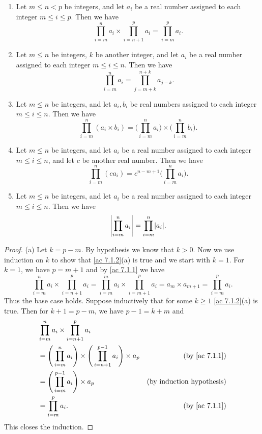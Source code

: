\begin{additional corollary}\label{ac 7.1.2}
\mbox{}
\begin{enumerate}
  \item Let \(m \leq n < p\) be integers, and let \(a_i\) be a real number assigned to each integer \(m \leq i \leq p\).
        Then we have
        \[
          \prod_{i = m}^n a_i \times \prod_{i = n + 1}^p a_i = \prod_{i = m}^p a_i.
        \]
  \item Let \(m \leq n\) be integers, \(k\) be another integer, and let \(a_i\) be a real number assigned to each integer \(m \leq i \leq n\).
        Then we have
        \[
          \prod_{i = m}^n a_i = \prod_{j = m + k}^{n + k} a_{j - k}.
        \]
  \item Let \(m \leq n\) be integers, and let \(a_i, b_i\) be real numbers assigned to each integer \(m \leq i \leq n\).
        Then we have
        \[
          \prod_{i = m}^n (a_i \times b_i) = \Bigg(\prod_{i = m}^n a_i\Bigg) \times \Bigg(\prod_{i = m}^n b_i\Bigg).
        \]
  \item Let \(m \leq n\) be integers, and let \(a_i\) be a real number assigned to each integer \(m \leq i \leq n\), and let \(c\) be another real number.
        Then we have
        \[
          \prod_{i = m}^n (ca_i) = c^{n - m + 1} \Bigg(\prod_{i = m}^n a_i\Bigg).
        \]
  \item Let \(m \leq n\) be integers, and let \(a_i\) be a real number assigned to each integer \(m \leq i \leq n\).
        Then we have
        \[
          \abs{\prod_{i = m}^n a_i} = \prod_{i = m}^n \abs{a_i}.
        \]
\end{enumerate}
\end{additional corollary}

\begin{proof}{(a)}
  Let \(k = p - m\).
  By hypothesis we know that \(k > 0\).
  Now we use induction on \(k\) to show that \cref{ac 7.1.2}(a) is true and we start with \(k = 1\).
  For \(k = 1\), we have \(p = m + 1\) and by \cref{ac 7.1.1} we have
  \[
    \prod_{i = m}^n a_i \times \prod_{i = n + 1}^p a_i = \prod_{i = m}^m a_i \times \prod_{i = m + 1}^p a_i = a_m \times a_{m + 1} = \prod_{i = m}^p a_i.
  \]
  Thus the base case holds.
  Suppose inductively that for some \(k \geq 1\) \cref{ac 7.1.2}(a) is true.
  Then for \(k + 1 = p - m\), we have \(p - 1 = k + m\) and
  \begin{align*}
     & \prod_{i = m}^n a_i \times \prod_{i = n + 1}^p a_i                                                                               \\
     & = \Bigg(\prod_{i = m}^n a_i\Bigg) \times \Bigg(\prod_{i = n + 1}^{p - 1} a_i\Bigg) \times a_p & \text{(by \cref{ac 7.1.1})}      \\
     & = \Bigg(\prod_{i = m}^{p - 1} a_i\Bigg) \times a_p                                            & \text{(by induction hypothesis)} \\
     & = \prod_{i = m}^p a_i.                                                                        & \text{(by \cref{ac 7.1.1})}
  \end{align*}
  This closes the induction.
\end{proof}

